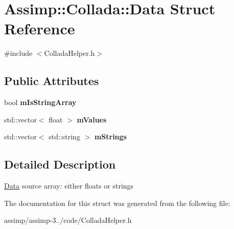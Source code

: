 \hypertarget{struct_assimp_1_1_collada_1_1_data}{\section{Assimp\+:\+:Collada\+:\+:Data Struct Reference}
\label{struct_assimp_1_1_collada_1_1_data}
}


{\ttfamily \#include $<$Collada\+Helper.\+h$>$}

\subsection*{Public Attributes}
\begin{DoxyCompactItemize}
\item 
\hypertarget{struct_assimp_1_1_collada_1_1_data_ae0662f46b8c360ee9b28eea6f4345fc0}{bool {\bfseries m\+Is\+String\+Array}}\label{struct_assimp_1_1_collada_1_1_data_ae0662f46b8c360ee9b28eea6f4345fc0}

\item 
\hypertarget{struct_assimp_1_1_collada_1_1_data_a312686d65c6f2a6fdee513f11df04ca2}{std\+::vector$<$ float $>$ {\bfseries m\+Values}}\label{struct_assimp_1_1_collada_1_1_data_a312686d65c6f2a6fdee513f11df04ca2}

\item 
\hypertarget{struct_assimp_1_1_collada_1_1_data_af2b662f94fdcf4f821976974893980f0}{std\+::vector$<$ std\+::string $>$ {\bfseries m\+Strings}}\label{struct_assimp_1_1_collada_1_1_data_af2b662f94fdcf4f821976974893980f0}

\end{DoxyCompactItemize}


\subsection{Detailed Description}
\hyperlink{struct_assimp_1_1_collada_1_1_data}{Data} source array\+: either floats or strings 

The documentation for this struct was generated from the following file\+:\begin{DoxyCompactItemize}
\item 
assimp/assimp-\/3../code/Collada\+Helper.\+h\end{DoxyCompactItemize}

